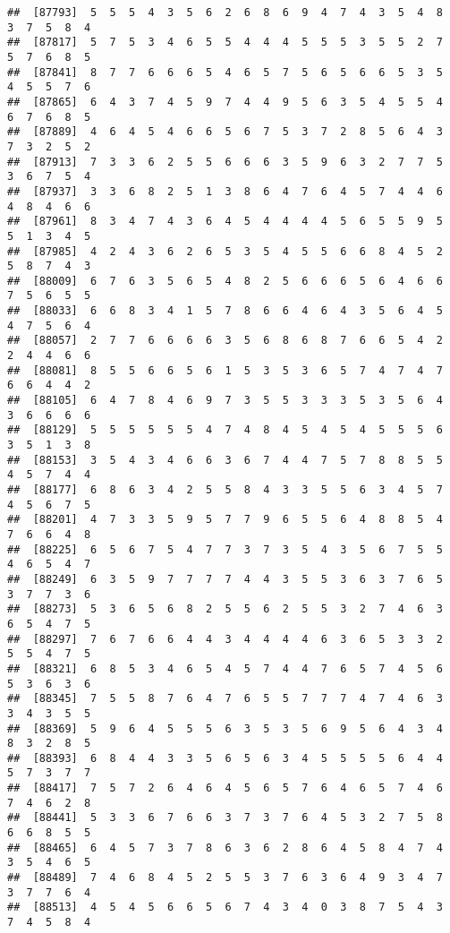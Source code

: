 \documentclass[
]{book}
\begin{document}
\begin{verbatim}
##  [87793]  5  5  5  4  3  5  6  2  6  8  6  9  4  7  4  3  5  4  8  3  7  5  8  4
##  [87817]  5  7  5  3  4  6  5  5  4  4  4  5  5  5  3  5  5  2  7  5  7  6  8  5
##  [87841]  8  7  7  6  6  6  5  4  6  5  7  5  6  5  6  6  5  3  5  4  5  5  7  6
##  [87865]  6  4  3  7  4  5  9  7  4  4  9  5  6  3  5  4  5  5  4  6  7  6  8  5
##  [87889]  4  6  4  5  4  6  6  5  6  7  5  3  7  2  8  5  6  4  3  7  3  2  5  2
##  [87913]  7  3  3  6  2  5  5  6  6  6  3  5  9  6  3  2  7  7  5  3  6  7  5  4
##  [87937]  3  3  6  8  2  5  1  3  8  6  4  7  6  4  5  7  4  4  6  4  8  4  6  6
##  [87961]  8  3  4  7  4  3  6  4  5  4  4  4  4  5  6  5  5  9  5  5  1  3  4  5
##  [87985]  4  2  4  3  6  2  6  5  3  5  4  5  5  6  6  8  4  5  2  5  8  7  4  3
##  [88009]  6  7  6  3  5  6  5  4  8  2  5  6  6  6  5  6  4  6  6  7  5  6  5  5
##  [88033]  6  6  8  3  4  1  5  7  8  6  6  4  6  4  3  5  6  4  5  4  7  5  6  4
##  [88057]  2  7  7  6  6  6  6  3  5  6  8  6  8  7  6  6  5  4  2  2  4  4  6  6
##  [88081]  8  5  5  6  6  5  6  1  5  3  5  3  6  5  7  4  7  4  7  6  6  4  4  2
##  [88105]  6  4  7  8  4  6  9  7  3  5  5  3  3  3  5  3  5  6  4  3  6  6  6  6
##  [88129]  5  5  5  5  5  5  4  7  4  8  4  5  4  5  4  5  5  5  6  3  5  1  3  8
##  [88153]  3  5  4  3  4  6  6  3  6  7  4  4  7  5  7  8  8  5  5  4  5  7  4  4
##  [88177]  6  8  6  3  4  2  5  5  8  4  3  3  5  5  6  3  4  5  7  4  5  6  7  5
##  [88201]  4  7  3  3  5  9  5  7  7  9  6  5  5  6  4  8  8  5  4  7  6  6  4  8
##  [88225]  6  5  6  7  5  4  7  7  3  7  3  5  4  3  5  6  7  5  5  4  6  5  4  7
##  [88249]  6  3  5  9  7  7  7  7  4  4  3  5  5  3  6  3  7  6  5  3  7  7  3  6
##  [88273]  5  3  6  5  6  8  2  5  5  6  2  5  5  3  2  7  4  6  3  6  5  4  7  5
##  [88297]  7  6  7  6  6  4  4  3  4  4  4  4  6  3  6  5  3  3  2  5  5  4  7  5
##  [88321]  6  8  5  3  4  6  5  4  5  7  4  4  7  6  5  7  4  5  6  5  3  6  3  6
##  [88345]  7  5  5  8  7  6  4  7  6  5  5  7  7  7  4  7  4  6  3  3  4  3  5  5
##  [88369]  5  9  6  4  5  5  5  6  3  5  3  5  6  9  5  6  4  3  4  8  3  2  8  5
##  [88393]  6  8  4  4  3  3  5  6  5  6  3  4  5  5  5  5  6  4  4  5  7  3  7  7
##  [88417]  7  5  7  2  6  4  6  4  5  6  5  7  6  4  6  5  7  4  6  7  4  6  2  8
##  [88441]  5  3  3  6  7  6  6  3  7  3  7  6  4  5  3  2  7  5  8  6  6  8  5  5
##  [88465]  6  4  5  7  3  7  8  6  3  6  2  8  6  4  5  8  4  7  4  3  5  4  6  5
##  [88489]  7  4  6  8  4  5  2  5  5  3  7  6  3  6  4  9  3  4  7  3  7  7  6  4
##  [88513]  4  5  4  5  6  6  5  6  7  4  3  4  0  3  8  7  5  4  3  7  4  5  8  4

\end{verbatim}
\end{document}
